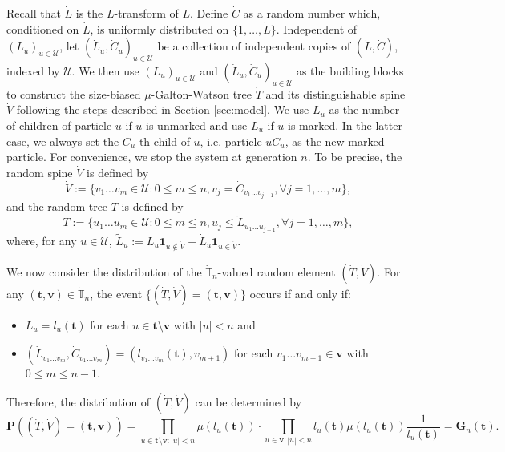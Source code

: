 \documentclass[12pt,a4paper]{amsart}
\numberwithin{equation}{section}
\begin{document}
	Recall that $\dot L$ is the $L$-transform of $L$.
	Define $\dot C$ as a random number which, conditioned on $\dot L$, is uniformly distributed on $\{1,\dots,\dot L\}$.
	Independent of $(L_u)_{u\in\mathcal U}$, let $(\dot L_u,\dot C_u)_{u\in \mathcal U}$ be a collection of independent copies of $(\dot L,\dot C)$, indexed by $\mathcal U$.
	We then use $(L_u)_{u\in\mathcal U}$ and $(\dot L_u,\dot C_u)_{u\in\mathcal U}$ as the building blocks to construct the size-biased $\mu$-Galton-Watson tree $\dot T$ and its distinguishable spine $\dot V$ following the steps described in Section \ref{sec:model}.
	We use $L_u$ as the number of children of particle $u$ if $u$ is unmarked and use $\dot L_u$ if $u$ is marked.
	In the latter case, we always set the $C_u$-th child of $u$, i.e. particle $uC_u$, as the new marked particle.
	For convenience, we stop the system at generation $n$. To be precise, the random spine $\dot V$ is defined by
\begin{equation*}
		\dot V
	:=\{v_1\dots v_m\in \mathcal U:0\le m\le n, v_j=\dot C_{v_1\dots v_{j-1}},\forall j=1,\dots,m\},
\end{equation*}
	and the random tree $\dot T$ is defined by
\begin{equation*}
		\dot T
	:=\{u_1\dots u_m\in\mathcal U: 0\le m\le n,u_j\leq \tilde L_{u_1\dots u_{j-1}},\forall j=1,\dots,m\},
\end{equation*}
	where, for any $u\in\mathcal U$, $\tilde L_u:=L_u\mathbf 1_{u\not\in \dot V}+\dot L_u\mathbf 1_{u\in \dot V}$.

	We now consider the distribution of the $\dot{\mathbb T}_n$-valued random element $(\dot T,\dot V)$.
	For any $( \mathbf t , \mathbf v)\in\dot{\mathbb T}_n$, the event $\{(\dot T,\dot V)=( \mathbf t , \mathbf v)\}$ occurs if and only if:
\begin{itemize}
\item
    $L_u=l_u( \mathbf t )$ for each $u\in  \mathbf t \setminus \mathbf v$ with $| u |<n$ and
\item
	$(\dot L_{v_1\dots v_m},\dot C_{v_1\dots v_m})=(l_{v_1\dots v_m}( \mathbf t ),v_{m+1})$ for each $v_1\dots v_{m+1}\in \mathbf v$ with $0\le m\le n-1$.
\end{itemize}
    Therefore, the distribution of $(\dot T,\dot V)$ can be determined by
\begin{equation}
\label{eq:treespinemeasure}
		\mathbf P((\dot T,\dot V)=( \mathbf t , \mathbf v))
	=\prod_{u\in  \mathbf t \setminus \mathbf v:|u|<n}\mu(l_u( \mathbf t ))
	\cdot \prod_{u\in  \mathbf v:| u| <n}l_u( \mathbf t )\mu(l_u( \mathbf t ))\frac{1}{l_u( \mathbf t )}
	= \mathbf G_n( \mathbf t ).
\end{equation}
	
\end{document}
